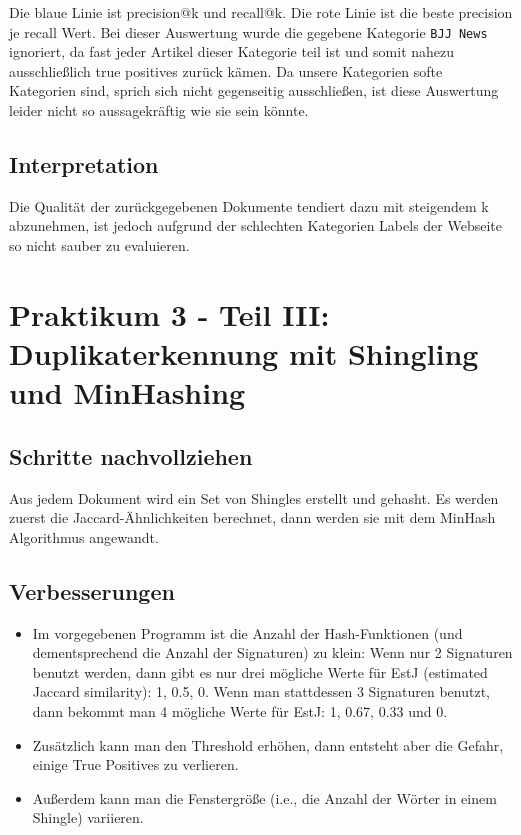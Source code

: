 \noindent Die blaue Linie ist precision@k und recall@k. Die rote Linie ist die beste precision je recall Wert. Bei dieser Auswertung wurde die gegebene Kategorie \texttt{BJJ News} ignoriert, da fast jeder Artikel dieser Kategorie teil ist und somit nahezu ausschlie{\ss}lich true positives zurück kämen. Da unsere Kategorien softe Kategorien sind, sprich sich nicht gegenseitig ausschlie{\ss}en, ist diese Auswertung leider nicht so aussagekräftig wie sie sein könnte.

\subsection{Interpretation}

Die Qualität der zurückgegebenen Dokumente tendiert dazu mit steigendem k abzunehmen, ist jedoch aufgrund der schlechten Kategorien Labels der Webseite so nicht sauber zu evaluieren.

\setcounter{section}{2}
\section{Praktikum 3 - Teil III: Duplikaterkennung mit Shingling und MinHashing}

\subsection{Schritte nachvollziehen}

Aus jedem Dokument wird ein Set von Shingles erstellt und gehasht. Es werden zuerst die Jaccard-Ähnlichkeiten berechnet, dann werden sie mit dem MinHash Algorithmus angewandt.

\subsection{Verbesserungen}

\begin{itemize}
	\item Im vorgegebenen Programm ist die Anzahl der Hash-Funktionen (und dementsprechend die Anzahl der Signaturen) zu klein: Wenn nur 2 Signaturen benutzt werden, dann gibt es nur drei mögliche Werte für EstJ (estimated Jaccard similarity): 1, 0.5, 0. Wenn man stattdessen 3 Signaturen benutzt, dann bekommt man 4 mögliche Werte für EstJ: 1, 0.67, 0.33 und 0.
	\item Zusätzlich kann man den Threshold erhöhen, dann entsteht aber die Gefahr, einige True Positives zu verlieren.
	\item Außerdem kann man die Fenstergröße (i.e., die Anzahl der Wörter in einem Shingle) variieren.
\end{itemize}

